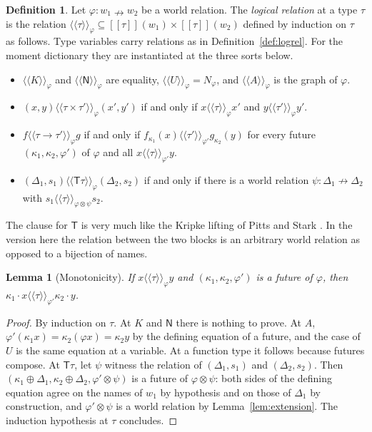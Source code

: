 \documentclass[11pt,a4paper]{report}
\theoremstyle{plain}
\newtheorem{lemma}[theorem]{Lemma}
\theoremstyle{definition}
\newtheorem{definition}[theorem]{Definition}
\theoremstyle{remark}
\newcommand{\T}{\mathsf{T}}
\newcommand{\Nat}{\mathsf{N}}
\newcommand{\den}[2]{[\![#1]\!]_{#2}}
\newcommand{\rel}[2]{\langle\!\langle #1 \rangle\!\rangle_{#2}}
\begin{document}
\begin{definition}
\label{def:kripke-logrel}
Let $\varphi : w_1 \nrightarrow w_2$ be a world relation. The \emph{logical
relation} at a type $\tau$ is the relation
$\rel{\tau}{\varphi} \subseteq \den{\tau}{}(w_1) \times \den{\tau}{}(w_2)$
defined by induction on $\tau$ as follows. Type variables carry relations as in
Definition~\ref{def:logrel}. For the moment dictionary they are instantiated at
the three sorts below.
\begin{itemize}
\item $\rel{K}{\varphi}$ and $\rel{\Nat}{\varphi}$ are equality,
  $\rel{U}{\varphi} = N_\varphi$, and $\rel{A}{\varphi}$ is the graph of
  $\varphi$.
\item $(x, y) \mathrel{\rel{\tau \times \tau'}{\varphi}} (x', y')$ if and only if
  $x \mathrel{\rel{\tau}{\varphi}} x'$ and $y \mathrel{\rel{\tau'}{\varphi}} y'$.
\item $f \mathrel{\rel{\tau \to \tau'}{\varphi}} g$ if and only if
  $f_{\kappa_1}(x) \mathrel{\rel{\tau'}{\varphi'}} g_{\kappa_2}(y)$ for every
  future $(\kappa_1, \kappa_2, \varphi')$ of $\varphi$ and all
  $x \mathrel{\rel{\tau}{\varphi'}} y$.
\item $(\Delta_1, s_1) \mathrel{\rel{\T\tau}{\varphi}} (\Delta_2, s_2)$ if and
  only if there is a world relation $\psi : \Delta_1 \nrightarrow \Delta_2$ with
  $s_1 \mathrel{\rel{\tau}{\varphi \otimes \psi}} s_2$.
\end{itemize}
\end{definition}

The clause for $\T$ is very much like the Kripke lifting of Pitts and Stark
\cite{PittsStark1993}. In the version here the relation between the two blocks is an
arbitrary world relation as opposed to a bijection of names.

\begin{lemma}[Monotonicity]
\label{lem:monotone}
If $x \mathrel{\rel{\tau}{\varphi}} y$ and $(\kappa_1, \kappa_2, \varphi')$ is a
future of $\varphi$, then
$\kappa_1 \cdot x \mathrel{\rel{\tau}{\varphi'}} \kappa_2 \cdot y$.
\end{lemma}

\begin{proof}
By induction on $\tau$. At $K$ and $\Nat$ there is nothing to prove. At $A$,
$\varphi'(\kappa_1 x) = \kappa_2(\varphi x) = \kappa_2 y$ by the defining equation
of a future, and the case of $U$ is the same equation at a variable. At a function
type it follows because futures compose. At $\T\tau$, let $\psi$ witness the
relation of $(\Delta_1, s_1)$ and $(\Delta_2, s_2)$. Then
$(\kappa_1 \oplus \Delta_1, \kappa_2 \oplus \Delta_2, \varphi' \otimes \psi)$ is a
future of $\varphi \otimes \psi$: both sides of the defining equation agree on the
names of $w_1$ by hypothesis and on those of $\Delta_1$ by construction, and
$\varphi' \otimes \psi$ is a world relation by Lemma~\ref{lem:extension}. The
induction hypothesis at $\tau$ concludes.
\end{proof}
\end{document}
